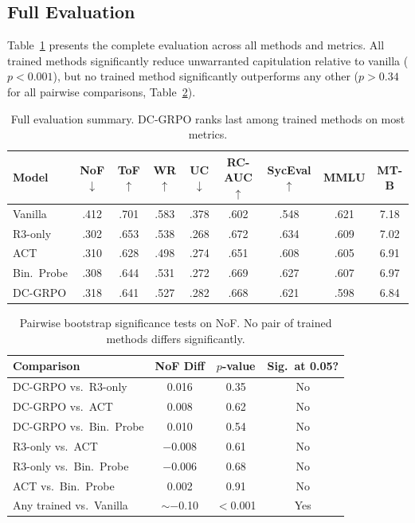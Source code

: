 \documentclass[11pt,a4paper]{article}
\begin{document}
\subsection{Full Evaluation}
\label{sec:full_eval}

Table~\ref{tab:main_results} presents the complete evaluation across all methods and metrics. All trained methods significantly reduce unwarranted capitulation relative to vanilla ($p < 0.001$), but no trained method significantly outperforms any other ($p > 0.34$ for all pairwise comparisons, Table~\ref{tab:significance}).

\begin{table}[h]
\centering
\caption{Full evaluation summary. DC-GRPO ranks last among trained methods on most metrics.}
\label{tab:main_results}
\small
\begin{tabular}{lcccccccc}
\toprule
Model & NoF $\downarrow$ & ToF $\uparrow$ & WR $\uparrow$ & UC $\downarrow$ & RC-AUC $\uparrow$ & SycEval $\uparrow$ & MMLU & MT-B \\
\midrule
Vanilla    & .412 & .701 & .583 & .378 & .602 & .548 & .621 & 7.18 \\
R3-only    & .302 & .653 & .538 & .268 & .672 & .634 & .609 & 7.02 \\
ACT        & .310 & .628 & .498 & .274 & .651 & .608 & .605 & 6.91 \\
Bin.\ Probe & .308 & .644 & .531 & .272 & .669 & .627 & .607 & 6.97 \\
DC-GRPO    & .318 & .641 & .527 & .282 & .668 & .621 & .598 & 6.84 \\
\bottomrule
\end{tabular}
\end{table}

\begin{table}[h]
\centering
\caption{Pairwise bootstrap significance tests on NoF. No pair of trained methods differs significantly.}
\label{tab:significance}
\small
\begin{tabular}{lccc}
\toprule
Comparison & NoF Diff & $p$-value & Sig.\ at 0.05? \\
\midrule
DC-GRPO vs.\ R3-only    & 0.016  & 0.35 & No \\
DC-GRPO vs.\ ACT        & 0.008  & 0.62 & No \\
DC-GRPO vs.\ Bin.\ Probe & 0.010  & 0.54 & No \\
R3-only vs.\ ACT        & $-0.008$ & 0.61 & No \\
R3-only vs.\ Bin.\ Probe & $-0.006$ & 0.68 & No \\
ACT vs.\ Bin.\ Probe    & 0.002  & 0.91 & No \\
Any trained vs.\ Vanilla & $\sim$$-$0.10 & $<$0.001 & Yes \\
\bottomrule
\end{tabular}
\end{table}
\end{document}
